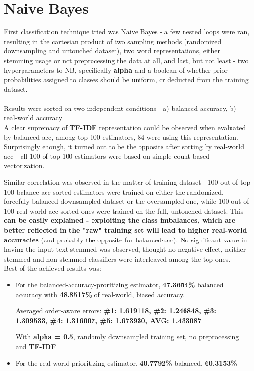 \documentclass[letterpaper]{article}
\begin{document}
\section{Naive Bayes}
First classification technique tried was Naive Bayes - a few nested loops were ran, resulting in
the cartesian product of two sampling methods (randomized downsampling and untouched dataset),
two word representations, either stemming usage or not preprocessing the data at all, and last, but
not least - two hyperparameters to NB, specifically \textbf{alpha} and a boolean of whether
prior probabilities assigned to classes should be uniform, or deducted from the training dataset.

\paragraph{}
Results were sorted on two independent conditions - a) balanced accuracy, b) real-world accuracy\\
A clear supremacy of \textbf{TF-IDF} representation could be observed when evaluated by balanced acc,
among top 100 estimators, 84 were using this representation.
Surprisingly enough, it turned out to be the opposite after sorting by real-world acc - all 100 of top 100
estimators were based on simple count-based vectorization.

\par Similar correlation was observed in the matter of training dataset -
100 out of top 100 balance-acc-sorted
estimators were trained on either the randomized,
forcefuly balanced downsampled dataset or the oversampled one, while 100 out of 100
real-world-acc sorted ones were trained on the full, untouched dataset.
This \textbf{can be easily explained - exploiting the class imbalances, which are better reflected in the
"raw" training set will lead to higher real-world accuracies} (and probably the opposite for balanced-acc).
No significant value in having the input text stemmed was observed, thought no negative effect, neither -
stemmed and non-stemmed classifiers were interleaved among the top ones.\\
Best of the achieved results was:

\begin{itemize}
    \item For the balanced-accuracy-proritizing estimator,
    \textbf{47.3654\%} balanced accuracy with \textbf{48.8517\%} of real-world, biased accuracy.
    
    Averaged order-aware errors:
    \textbf{\#1: 1.619118, \#2: 1.246848, \#3: 1.309533, \#4: 1.316007, \#5: 1.673930, AVG: 1.433087}
    
    With \textbf{alpha = 0.5}, randomly downsampled training set, no preprocessing and \textbf{TF-IDF}
    \item For the real-world-prioritizing estimator, \textbf{40.7792\%} balanced, \textbf{60.3153\%}
\end{itemize}
\end{document}
